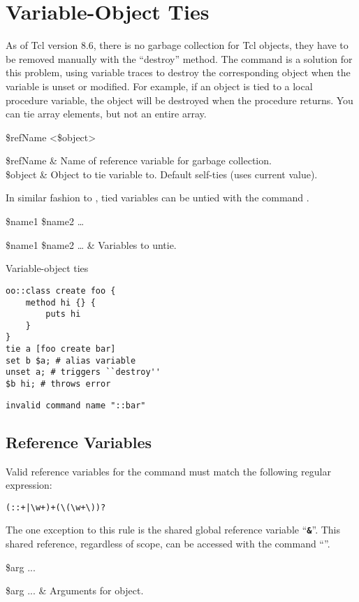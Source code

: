 \documentclass{article}
\begin{document}
\clearpage

\section{Variable-Object Ties}
As of Tcl version 8.6, there is no garbage collection for Tcl objects, they have to be removed manually with the ``destroy'' method. 
The command  is a solution for this problem, using variable traces to destroy the corresponding object when the variable is unset or modified. 
For example, if an object is tied to a local procedure variable, the object will be destroyed when the procedure returns.
You can tie array elements, but not an entire array.

\begin{syntax}
 \$refName <\$object>
\end{syntax}
\begin{args}
\$refName & Name of reference variable for garbage collection. \\
\$object & Object to tie variable to. Default self-ties (uses current value).
\end{args}

In similar fashion to , tied variables can be untied with the command .
\begin{syntax}
 \$name1 \$name2 …
\end{syntax}
\begin{args}
\$name1 \$name2 … & Variables to untie.
\end{args}

\begin{example}{Variable-object ties}
\begin{lstlisting}
oo::class create foo {
    method hi {} {
        puts hi
    }
}
tie a [foo create bar]
set b $a; # alias variable
unset a; # triggers ``destroy''
$b hi; # throws error
\end{lstlisting}
\tcblower
\begin{lstlisting}
invalid command name "::bar"
\end{lstlisting}
\end{example}
\clearpage
\subsection{Reference Variables}
Valid reference variables for the  command must match the following regular expression:
\begin{lstlisting}
(::+|\w+)+(\(\w+\))?
\end{lstlisting}
The one exception to this rule is the shared global reference variable ``\textbf{\texttt{\&}}''.
This shared reference, regardless of scope, can be accessed with the command ``\textbf{\texttt{\cmdlink{\$\&}}}''.
\begin{syntax}
\command{\$\&} \$arg ...
\end{syntax}
\begin{args}
\$arg ... & Arguments for object.
\end{args}
\end{document}
